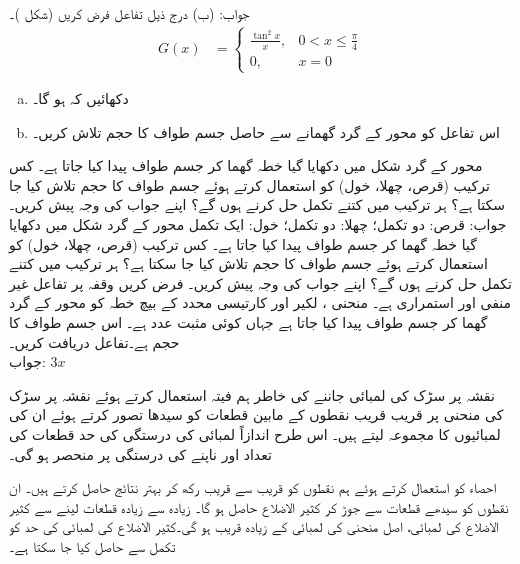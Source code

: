 جواب:\quad
(ب) 
درج ذیل تفاعل فرض کریں (شکل )۔
\begin{align*}
G(x)&=\begin{cases}
\frac{\tan^2 x}{x},& 0<x\le \frac{\pi}{4}\\
0,& x=0
\end{cases}
\end{align*}
\begin{enumerate}[a.]
\item
دکھائیں کہ  ہو گا۔
\item
اس تفاعل کو  محور کے گرد گھمانے سے حاصل جسم طواف کا حجم تلاش کریں۔
\end{enumerate}
محور  کے گرد شکل  میں دکھایا گیا خطہ گھما کر جسم طواف پیدا کیا جاتا ہے۔ کس ترکیب (قرص، چھلا، خول) کو استعمال کرتے ہوئے جسم طواف کا حجم تلاش کیا جا سکتا ہے؟ ہر ترکیب میں کتنے تکمل حل کرنے ہوں گے؟
 اپنے جواب کی وجہ پیش کریں۔\\
جواب:\quad
قرص: دو تکمل؛ چھلا: دو تکمل؛ خول: ایک تکمل
محور  کے گرد شکل  میں دکھایا گیا خطہ گھما کر جسم طواف پیدا کیا جاتا ہے۔ کس ترکیب (قرص، چھلا، خول) کو استعمال کرتے ہوئے جسم طواف کا حجم تلاش کیا جا سکتا ہے؟ ہر ترکیب میں کتنے تکمل حل کرنے ہوں گے؟ اپنے جواب کی وجہ پیش کریں۔
فرض کریں وقفہ  پر  تفاعل  غیر منفی اور استمراری ہے۔ منحنی ، لکیر  اور کارتیسی محدد کے بیچ خطہ کو  محور کے گرد گھما کر جسم طواف پیدا کیا جاتا ہے جہاں  کوئی مثبت عدد ہے۔ اس جسم طواف کا حجم  ہے۔تفاعل  دریافت کریں۔\\
جواب:\quad
$3x$


نقشہ پر سڑک کی لمبائی جاننے کی خاطر ہم فیتہ استعمال کرتے ہوئے نقشہ پر سڑک کی منحنی پر قریب قریب نقطوں کے مابین قطعات کو سیدھا تصور کرتے ہوئے ان کی لمبائیوں کا مجموعہ لیتے ہیں۔ اس طرح اندازاً لمبائی کی درستگی کی حد قطعات کی تعداد اور ناپنے کی درستگی پر منحصر ہو گی۔ 

احصاء کو استعمال کرتے ہوئے ہم نقطوں کو قریب سے قریب رکھ کر بہتر نتائج حاصل کرتے ہیں۔ ان نقطوں کو سیدھے قطعات سے  جوڑ کر کثیر الاضلاع حاصل ہو گا۔ زیادہ سے زیادہ قطعات لینے سے کثیر الاضلاع کی لمبائی،  اصل منحنی کی لمبائی کے زیادہ قریب ہو گی۔کثیر الاضلاع کی لمبائی کی حد کو تکمل سے حاصل کیا جا سکتا ہے۔

